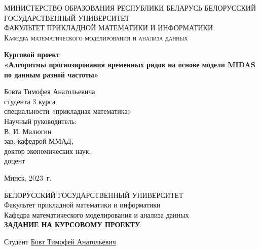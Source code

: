 \documentclass[a4paper, 12pt]{extarticle}
\begin{document}
	\def\contentsname{ОГЛАВЛЕНИЕ}
	
	\begin{titlepage}
		\begin{center}
			\textsc{МИНИСТЕРСТВО ОБРАЗОВАНИЯ РЕСПУБЛИКИ БЕЛАРУСЬ БЕЛОРУССКИЙ ГОСУДАРСТВЕННЫЙ УНИВЕРСИТЕТ
				\\[5mm]
				ФАКУЛЬТЕТ ПРИКЛАДНОЙ МАТЕМАТИКИ И ИНФОРМАТИКИ\\[2mm]
				Кафедра математического моделирования и анализа данных
			}
			
			\vfill
			
			\textbf{Курсовой проект
				\\[3mm]
				«Алгоритмы прогнозирования временных рядов на основе модели MIDAS по данным разной частоты»
				\\[26mm]
			}
		\end{center}
		
		\hfill
		\begin{minipage}{.5\textwidth}
			\begin{flushright}
			Бовта Тимофея Анатольевича\\
			студента 3 курса\\
			специальности «прикладная математика»\\[5mm]
			
			Научный руководитель:\\[2mm] 
			В. И. Малюгин\\
			зав. кафедрой ММАД,\\
			доктор экономических наук,\\
			доцент
			\end{flushright}
		\end{minipage}%
		\vfill
		\begin{center}
			Минск, 2023\ г.
		\end{center}
	\end{titlepage}
	\newpage
	\setcounter{page}{2}
	\begin{center}
		\large{БЕЛОРУССКИЙ ГОСУДАРСТВЕННЫЙ УНИВЕРСИТЕТ}
		\\[2mm]
		Факультет прикладной математики и информатики\\[5mm]
		Кафедра математического моделирования и анализа данных\\[5mm]
		\large{\textbf{ЗАДАНИЕ НА КУРСОВОМУ ПРОЕКТУ\\[20mm]}}
	\end{center}
	Студент \quad \underline{Бовт Тимофей Анатольевич\hspace*{\linegoal}}\\[2mm]
\end{document}
